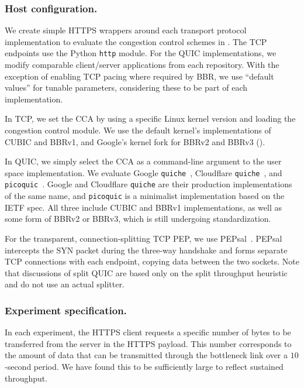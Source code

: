 \subsubsection{Host configuration.}

We create simple HTTPS wrappers around each transport protocol implementation to
evaluate the congestion control schemes in . The TCP
endpoints use the Python \texttt{http} module. For the QUIC implementations, we
modify comparable client/server applications from each repository.
With the exception of enabling TCP pacing where required by BBR, we use
``default values'' for tunable parameters, considering these to be part of each
implementation.

In TCP, we set the CCA by using a specific Linux kernel
version and loading the congestion control module. We use the default
kernel's implementations of CUBIC and BBRv1, and Google's kernel fork for
BBRv2 and BBRv3 ().

In QUIC, we simply select the CCA as a command-line
argument to the user space implementation. We evaluate Google \texttt
{quiche}~\cite{google-quiche}, Cloudflare \texttt{quiche}~\cite
{quiche}, and \texttt{picoquic}~\cite{picoquic}. Google and Cloudflare \texttt
{quiche} are their production implementations of the same name,
and \texttt{picoquic} is a minimalist implementation based on the IETF spec.
All three include CUBIC and BBRv1 implementations, as well as some form of
BBRv2 or BBRv3, which is still undergoing standardization.

For the transparent, connection-splitting TCP PEP, we use PEPsal~\cite
{caini2006pepsal}. PEPsal intercepts the SYN packet during the three-way
handshake and forms separate TCP connections with each endpoint,
copying data between the two sockets. Note that
discussions of split QUIC are based only on the split throughput heuristic
and do not use an actual splitter.

\subsubsection{Experiment specification.}
In each experiment, the HTTPS client requests a specific number of bytes to be
transferred from the server in the HTTPS payload. This number corresponds to the
amount of data that can be transmitted through the bottleneck link over a
$10$-second period. We have found this to be sufficiently large to reflect
sustained throughput.

